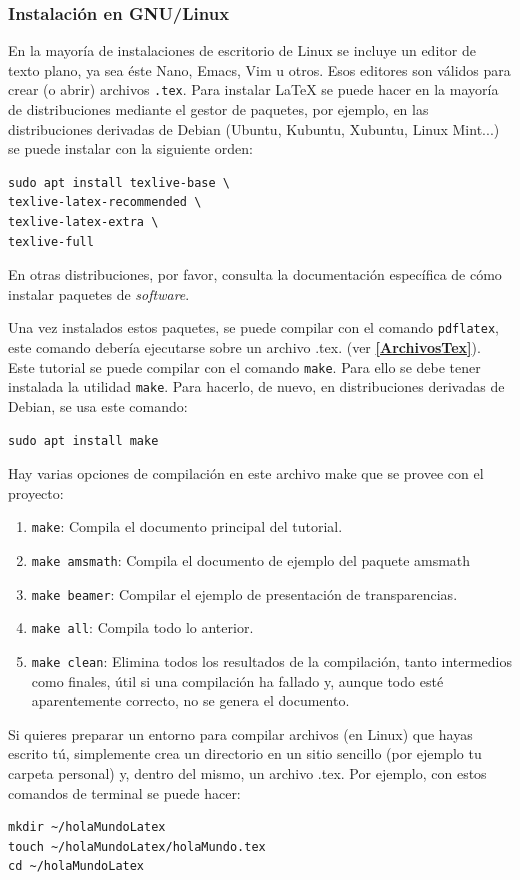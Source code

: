 \documentclass[a4paper]{article}
\begin{document}
\subsubsection{Instalación en GNU/Linux}\label{instGNULinux}
En la mayoría de instalaciones de escritorio de Linux se incluye un editor de
texto plano, ya sea éste Nano, Emacs, Vim u otros. Esos editores son válidos
para crear (o abrir) archivos \texttt{.tex}. Para instalar \LaTeX{} se puede
hacer en la mayoría de distribuciones mediante el gestor de paquetes, por
ejemplo, en las distribuciones derivadas de Debian (Ubuntu, Kubuntu, Xubuntu,
Linux Mint...) se puede instalar con la siguiente orden:
\begin{verbatim}
sudo apt install texlive-base \
texlive-latex-recommended \
texlive-latex-extra \
texlive-full
\end{verbatim} 
En otras distribuciones, 
por favor, consulta la documentación específica de cómo instalar paquetes de
\textit{software}.

Una vez instalados estos paquetes, se puede compilar con el comando
\texttt{pdflatex}, este comando debería ejecutarse sobre un archivo .tex.
(ver \textbf{\ref{ArchivosTex}}). Este tutorial se puede compilar
con el comando \texttt{make}. Para ello se debe tener instalada la utilidad 
\texttt{make}. Para hacerlo, de nuevo, en distribuciones derivadas de
Debian, se usa este comando:
\begin{verbatim}
sudo apt install make
\end{verbatim}

Hay varias opciones de compilación en este archivo make que se provee con el
proyecto:
\begin{enumerate}
\item \verb!make!: Compila el documento principal del tutorial.
\item \verb!make amsmath!: Compila el documento de ejemplo del paquete
amsmath
\item \verb!make beamer!: Compilar el ejemplo de presentación de transparencias.
\item \verb!make all!: Compila todo lo anterior.
\item \verb!make clean!: Elimina todos los resultados de la compilación, tanto
intermedios como finales, útil si una compilación ha fallado y, aunque todo
esté aparentemente correcto, no se genera el documento.
\end{enumerate}

Si quieres preparar un entorno para compilar archivos (en Linux) que hayas
escrito tú, simplemente crea un directorio en un sitio sencillo (por ejemplo tu
carpeta personal) y, dentro del mismo, un archivo .tex. Por ejemplo, con estos
comandos de terminal se puede hacer:
\begin{verbatim}
mkdir ~/holaMundoLatex
touch ~/holaMundoLatex/holaMundo.tex
cd ~/holaMundoLatex
\end{verbatim}
\end{document}
